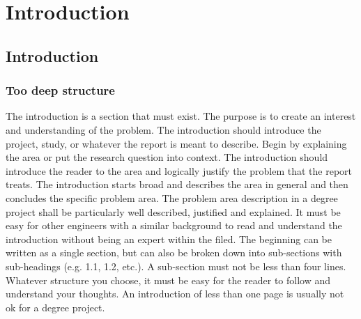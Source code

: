 
\clearpage

\fancyhead{} %
\fancyfoot[C]{\thepage}

\chapter{Introduction}\thispagestyle{fancy}

\section{Introduction}

\subsection{Too deep structure}
The introduction is a section that must exist. The purpose is to create an interest and understanding of the problem. The introduction should introduce the project, study, or whatever the report is meant to describe. Begin by explaining the area or put the research question into context. The introduction should introduce the reader to the area and logically justify the problem that the report treats. The introduction starts broad and describes the area in general and then concludes the specific problem area. The problem area description in a degree project shall be particularly well described, justified and explained. It must be easy for other engineers with a similar background to read and understand the introduction without being an expert within the filed. The beginning can be written as a single section, but can also be broken down into sub-sections with sub-headings (e.g. 1.1, 1.2, etc.). A sub-section must not be less than four lines. Whatever structure you choose, it must be easy for the reader to follow and understand your thoughts. An introduction of less than one page is usually not ok for a degree project. 

\begin{comment}
To write notes or comments that isn't published in the pdf.
\end{comment}

